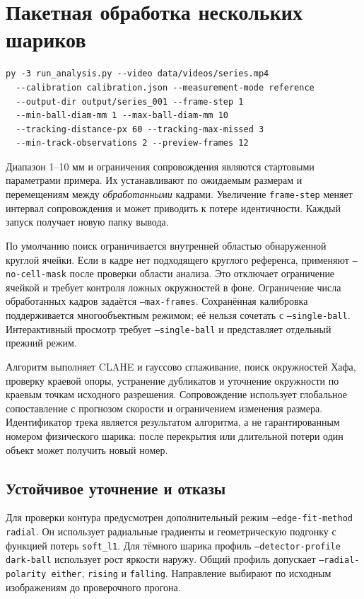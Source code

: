 \documentclass[12pt,a4paper]{article}
\begin{document}
\section{Пакетная обработка нескольких шариков}
\begin{verbatim}
py -3 run_analysis.py --video data/videos/series.mp4
  --calibration calibration.json --measurement-mode reference
  --output-dir output/series_001 --frame-step 1
  --min-ball-diam-mm 1 --max-ball-diam-mm 10
  --tracking-distance-px 60 --tracking-max-missed 3
  --min-track-observations 2 --preview-frames 12
\end{verbatim}
Диапазон 1--10 мм и ограничения сопровождения являются стартовыми параметрами примера. Их устанавливают по ожидаемым размерам и перемещениям между \emph{обработанными} кадрами. Увеличение \texttt{frame-step} меняет интервал сопровождения и может приводить к потере идентичности. Каждый запуск получает новую папку вывода.

По умолчанию поиск ограничивается внутренней областью обнаруженной круглой ячейки. Если в кадре нет подходящего круглого референса, применяют \texttt{--no-cell-mask} после проверки области анализа. Это отключает ограничение ячейкой и требует контроля ложных окружностей в фоне. Ограничение числа обработанных кадров задаётся \texttt{--max-frames}. Сохранённая калибровка поддерживается многообъектным режимом; её нельзя сочетать с \texttt{--single-ball}. Интерактивный просмотр требует \texttt{--single-ball} и представляет отдельный прежний режим.

Алгоритм выполняет CLAHE и гауссово сглаживание, поиск окружностей Хафа, проверку краевой опоры, устранение дубликатов и уточнение окружности по краевым точкам исходного разрешения. Сопровождение использует глобальное сопоставление с прогнозом скорости и ограничением изменения размера. Идентификатор трека является результатом алгоритма, а не гарантированным номером физического шарика: после перекрытия или длительной потери один объект может получить новый номер.

\clearpage
\subsection{Устойчивое уточнение и отказы}
Для проверки контура предусмотрен дополнительный режим \texttt{--edge-fit-method radial}. Он использует радиальные градиенты и геометрическую подгонку с функцией потерь \texttt{soft\_l1}. Для тёмного шарика профиль \texttt{--detector-profile dark-ball} использует рост яркости наружу. Общий профиль допускает \texttt{--radial-polarity either}, \texttt{rising} и \texttt{falling}. Направление выбирают по исходным изображениям до проверочного прогона.
\end{document}
